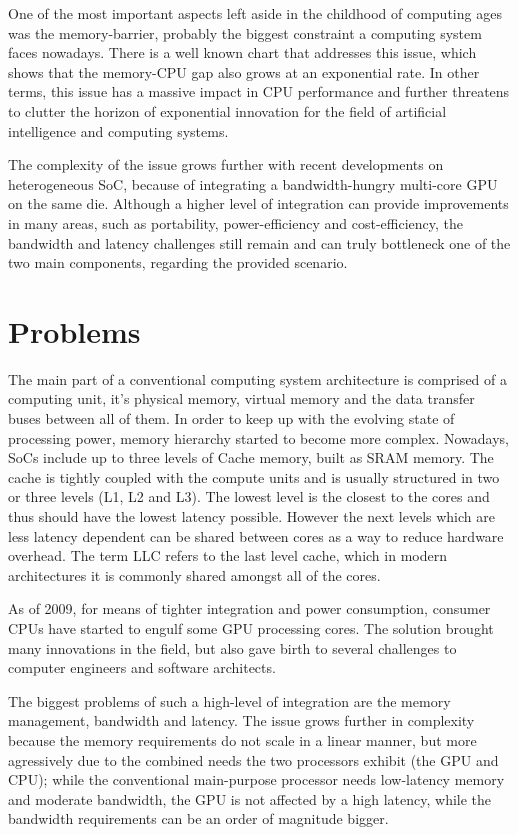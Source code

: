 \documentclass[10pt,journal,compsoc]{IEEEtran}
\begin{document}
One of the most important aspects left aside in the childhood of computing ages was the memory-barrier, probably the biggest constraint a computing system faces nowadays. There is a well known chart that addresses this issue, which shows that the memory-CPU gap also grows at an exponential rate. In other terms, this issue has a massive impact in CPU performance and further threatens to clutter the horizon of exponential innovation for the field of artificial intelligence and computing systems.

The complexity of the issue grows further with recent developments on heterogeneous SoC, because of integrating a bandwidth-hungry multi-core GPU on the same die. Although a higher level of integration can provide improvements in many areas, such as portability, power-efficiency and cost-efficiency, the bandwidth and latency challenges still remain and can truly bottleneck one of the two main components, regarding the provided scenario.

\section{Problems}
The main part of a conventional computing system architecture is comprised of a computing unit, it's physical memory, virtual memory and the data transfer buses between all of them. In order to keep up with the evolving state of processing power, memory hierarchy started to become more complex. Nowadays, SoCs include up to three levels of Cache memory, built as SRAM memory. The cache is tightly coupled with the compute units and is usually structured in two or three levels (L1, L2 and L3). The lowest level is the closest to the cores and thus should have the lowest latency possible. However the next levels which are less latency dependent can be shared between cores as a way to reduce hardware overhead. The term LLC refers to the last level cache, which in modern architectures it is commonly shared amongst all of the cores.

As of 2009, for means of tighter integration and power consumption, consumer CPUs have started to engulf some GPU processing cores. The solution brought many innovations in the field, but also gave birth to several challenges to computer engineers and software architects. 

The biggest problems of such a high-level of integration are the memory management, bandwidth and latency. The issue grows further in complexity because the memory requirements do not scale in a linear manner, but more agressively due to the combined needs the two processors exhibit (the GPU and CPU); while the conventional main-purpose processor needs low-latency memory and moderate bandwidth, the GPU is not affected by a high latency, while the bandwidth requirements can be an order of magnitude bigger.
\end{document}
